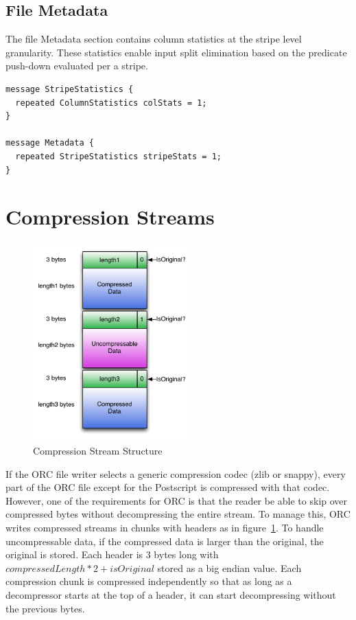 \documentclass{article}
\begin{document}
\subsection{File Metadata}

The file Metadata section contains column statistics at the stripe
level granularity. These statistics enable input split elimination
based on the predicate push-down evaluated per a stripe.

\begin{verbatim}
message StripeStatistics {
  repeated ColumnStatistics colStats = 1;
}

message Metadata {
  repeated StripeStatistics stripeStats = 1;
}
\end{verbatim}

\section{Compression Streams}

\begin{figure}
  \centering
  \includegraphics[width=2.4in]{CompressionStream.pdf}
  \caption{Compression Stream Structure}
  \label{compression-stream}
  \vspace{-20pt}
\end{figure}

If the ORC file writer selects a generic compression codec (zlib or
snappy), every part of the ORC file except for the Postscript is
compressed with that codec.  However, one of the requirements for ORC
is that the reader be able to skip over compressed bytes without
decompressing the entire stream. To manage this, ORC writes compressed
streams in chunks with headers as in figure~\ref{compression-stream}.
To handle uncompressable data, if the compressed data is larger than
the original, the original is stored. Each header is 3 bytes long with
$ compressedLength * 2 + isOriginal $ stored as a big endian
value. Each compression chunk is compressed independently so that as
long as a decompressor starts at the top of a header, it can start
decompressing without the previous bytes.
\end{document}
